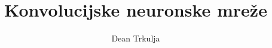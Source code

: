 \documentclass[scrartcl ,times, utf8, seminar]{fer}
\begin{document}
    \title{Konvolucijske neuronske mreže}
    \author{Dean Trkulja}
    \maketitle


    \tableofcontents
    
    
    
    
    
    
    
    
    
    

\end{document}
